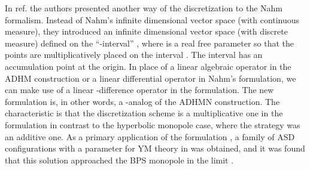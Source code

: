 \documentclass[a4paper,10pt]{article}
\providecommand{\sutwo}{\myHighlight{$SU(2)$}\coordHE{} }
\begin{document}
In ref.\cite{KN} the authors presented another way of the discretization to the Nahm formalism.
Instead of Nahm's infinite dimensional vector space \coordHE{} (with continuous measure), they introduced an infinite dimensional vector space \coordHE{} (with discrete measure) defined on the ``\coordHE{}-interval'' 
\coordHE{}  \coordHE{}, where \coordHE{} is a real free parameter so that the points are multiplicatively placed on the interval \coordHE{}.
The interval \coordHE{} has an accumulation point at the origin.
In place of a linear algebraic operator in the ADHM construction or a linear differential operator in  Nahm's formulation, we can make use of a linear \coordHE{}-difference operator in the \coordHE{} formulation.
The new formulation is, in other words, a \coordHE{}-analog of the ADHMN construction. 
The characteristic is that the discretization scheme is a multiplicative one in the \coordHE{} formulation in contrast to the hyperbolic monopole case, where the strategy was an additive one.
As a primary application of the \coordHE{} formulation \cite{KN}, a family of ASD configurations with a parameter \coordHE{} for  \sutwo YM theory in  \coordHE{} was obtained, and it was found that this solution approached the BPS monopole in the limit \coordHE{}.
\end{document}
